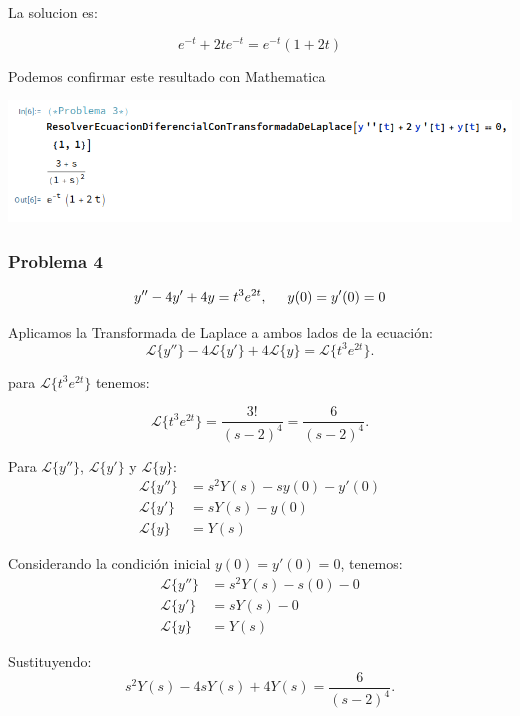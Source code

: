 \documentclass{article}
\begin{document}
La solucion es:

\[e^{-t} + 2te^{-t} = e^{-t}(1+2t)\]

Podemos confirmar este resultado con Mathematica

\begin{center}
    \includegraphics[width=1\textwidth]{../ED 2/image3.png}
\end{center}

\newpage

\subsubsection{Problema 4}
\[
    y'' - 4y' + 4y = t^{3}e^{2t}, \hspace{.5cm} y(0) = y'(0) = 0
\]

Aplicamos la Transformada de Laplace a ambos lados de la ecuación:
\[
    \mathcal{L}\{y''\} - 4\mathcal{L}\{y'\} + 4\mathcal{L}\{y\} = \mathcal{L}\{t^3e^{2t}\}.
\]

para \(\mathcal{L}\{t^3e^{2t}\}\) tenemos:

\begin{equation*}
    \mathcal{L}\{t^3e^{2t}\} = \frac{3!}{(s-2)^4} = \frac{6}{(s-2)^4}.
\end{equation*}

Para \(\mathcal{L}\{y''\}\), \(\mathcal{L}\{y'\}\) y \(\mathcal{L}\{y\}\):
\begin{align*}
    \mathcal{L}\{y''\} & = s^2Y(s) - sy(0) - y'(0) \\
    \mathcal{L}\{y'\}  & = sY(s) - y(0)            \\
    \mathcal{L}\{y\}   & = Y(s)
\end{align*}

Considerando la condición inicial \(y(0) = y'(0) = 0\), tenemos:
\begin{align*}
    \mathcal{L}\{y''\} & = s^2Y(s) - s(0) - 0 \\
    \mathcal{L}\{y'\}  & = sY(s) - 0          \\
    \mathcal{L}\{y\}   & = Y(s)
\end{align*}

Sustituyendo:
\begin{equation*}
    s^2Y(s) - 4sY(s) + 4Y(s) = \frac{6}{(s-2)^4}.
\end{equation*}
\end{document}
